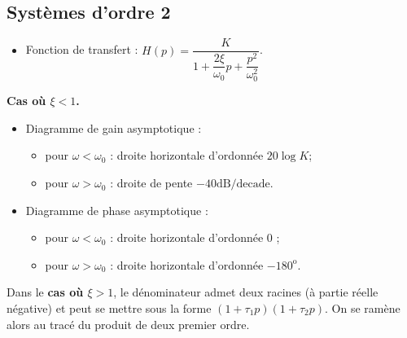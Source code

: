 \subsection{Systèmes d'ordre 2}


\begin{resultat}
\begin{itemize}
\item Fonction de transfert : $H(p)=\dfrac{K}{1+\dfrac{2\xi}{\omega_0}p+\dfrac{p^2}{\omega_0^2}}$.
\end{itemize}
\begin{center}
\textbf{Cas où $\xi<1$.}
\end{center}
\begin{itemize}
\item Diagramme de gain asymptotique : 
\begin{itemize}
\item pour $\omega<\omega_0$ : droite horizontale d'ordonnée $20 \log K$;
\item pour $\omega>\omega_0$ : droite de pente $-{40}\text{dB/decade}$.
\end{itemize}
\item Diagramme de phase asymptotique : 
\begin{itemize}
\item pour $\omega<\omega_0$ : droite horizontale d'ordonnée 0 \degre;
\item pour $\omega>\omega_0$ : droite horizontale d'ordonnée $-180^{\text{o}}$.
\end{itemize}
\end{itemize}


Dans le \textbf{cas où $\xi>1$}, le dénominateur admet deux racines (à partie réelle négative) et peut se mettre sous la forme  $\left(1+\tau_1 p \right)\left(1+\tau_2 p \right)$. On se ramène alors au tracé du produit de deux premier ordre.
\end{resultat}

